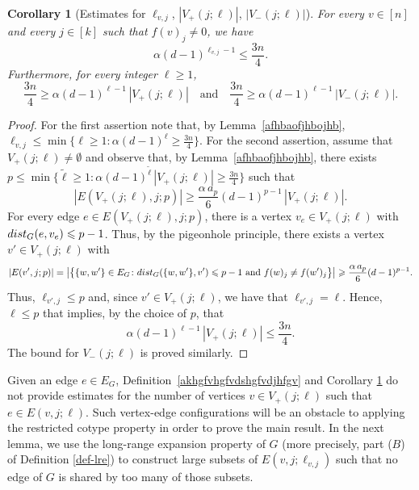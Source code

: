 \documentclass[11pt,leqno]{amsart}
\newtheorem{corollary}[theorem]{Corollary}
\theoremstyle{remark}
\theoremstyle{plain}
\def\dist{{\rm dist}}
\def\dist{{\rm dist}}
\begin{document}
\begin{corollary}[Estimates for $\ell_{v,j}$, $|V_{+}(j;\ell)|$, $|V_{-}(j;\ell)|$] \label{cor3.5-new}
For every $v\in[n]$ and every $j\in [k]$ such that $f(v)_j\neq 0$, we have
$$\alpha(d-1)^{\ell_{v,j}-1}\leqslant \frac{3n}{4}.$$
Furthermore, for every integer $\ell\geqslant 1$,
\begin{equation}\label{aifhgbvfkhgwvfkhgf}
\frac{3n}{4} \geqslant \alpha(d-1)^{\ell-1}\,|V_{+}(j;\ell)|
\ \ \ \text{ and } \ \ \ \frac{3n}{4} \geqslant \alpha(d-1)^{\ell-1}\,|V_{-}(j;\ell)|.
\end{equation}
\end{corollary}
\begin{proof}
For the first assertion note that, by Lemma~\ref{afhbaofjhbojhb},
$\ell_{v,j}\leqslant \min\{\ell\geqslant 1\colon \alpha(d-1)^\ell \geqslant \frac{3n}{4}\}$.
For the second assertion, assume that $V_{+}(j;\ell)\neq\emptyset$
and observe that, by Lemma~\ref{afhbaofjhbojhb}, there exists
$p\leqslant \min\big\{\tilde\ell\geqslant 1\colon \alpha(d-1)^{\tilde\ell}\,|V_{+}(j;\ell)| \geqslant \frac{3n}{4}\big\}$ such that
$$ |E(V_{+}(j;\ell),j;p)|\geqslant \frac{\alpha\, a_{p}}{6}(d-1)^{p-1}\,|V_{+}(j;\ell)|. $$
For every edge $e\in E(V_{+}(j;\ell),j;p)$, there is a vertex $v_e\in V_{+}(j;\ell)$ with $\dist_G(e,v_e)\leqslant p-1$.
Thus, by the pigeonhole principle, there exists a vertex $v'\in V_{+}(j;\ell)$ with
$$ |E(v',j;p)| =\big|\big\{\{w,w'\}\in E_G\colon \dist_G(\{w,w'\},v')\leqslant p-1 \text{ and }
f(w)_j\neq f(w')_j\big\}\big| \geqslant \frac{\alpha\, a_{p}}{6}(d-1)^{p-1}. $$
Thus, $\ell_{v',j}\leqslant p$ and, since $v'\in V_+(j;\ell)$, we have that $\ell_{v',j}=\ell$. Hence,
$\ell\leqslant p$ that implies, by the choice of $p$, that
$$ \alpha(d-1)^{\ell-1}\,|V_{+}(j;\ell)|\leqslant \frac{3n}{4}. $$
The bound for $V_{-}(j;\ell)$ is proved similarly.
\end{proof}
Given an edge $e\in E_G$, Definition~\ref{akhgfvhgfvdshgfvdjhfgv} and Corollary \ref{cor3.5-new}
do not provide estimates for the number of vertices $v\in V_{+}(j;\ell)$ such that $e\in E(v,j;\ell)$.
Such vertex-edge configurations will be an obstacle to applying the restricted cotype property in order
to prove the main result. In the next lemma, we use the long-range expansion property of $G$ (more precisely,
part (\hyperref[Part-B]{$B$}) of Definition \ref{def-lre}) to construct large subsets of $E(v,j;\ell_{v,j})$
such that no edge of $G$ is shared by too many of those subsets.
\end{document}
